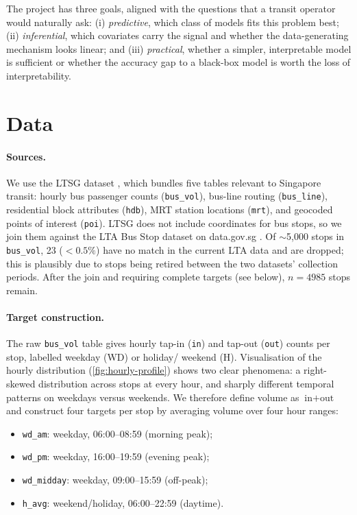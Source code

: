 \documentclass{article}
\begin{document}
The project has three goals, aligned with the questions that a transit
operator would naturally ask: (i) \emph{predictive}, which class of models
fits this problem best; (ii) \emph{inferential}, which covariates carry the
signal and whether the data-generating mechanism looks linear; and (iii)
\emph{practical}, whether a simpler, interpretable model is sufficient or
whether the accuracy gap to a black-box model is worth the loss of
interpretability.

\section{Data}
\label{sec:data}

\paragraph{Sources.}
We use the LTSG dataset \citep{rs14153579}, which bundles five tables
relevant to Singapore transit: hourly bus passenger counts
(\texttt{bus\_vol}), bus-line routing (\texttt{bus\_line}), residential
block attributes (\texttt{hdb}), MRT station locations (\texttt{mrt}), and
geocoded points of interest (\texttt{poi}). LTSG does not include
coordinates for bus stops, so we join them against the LTA Bus Stop dataset
on data.gov.sg \citep{lta2025busstop}. Of $\sim$5,000 stops in \texttt{bus\_vol}, 23 ($<0.5\%$)
have no match in the current LTA data and are dropped; this is plausibly
due to stops being retired between the two datasets' collection periods.
After the join and requiring complete targets (see below), $n = 4985$ stops remain.

\paragraph{Target construction.}
The raw \texttt{bus\_vol} table gives hourly tap-in (\texttt{in}) and
tap-out (\texttt{out}) counts per stop, labelled weekday (WD) or holiday/
weekend (H). Visualisation of the hourly distribution
(\cref{fig:hourly-profile}) shows two clear phenomena: a right-skewed
distribution across stops at every hour, and sharply different temporal
patterns on weekdays versus weekends. We therefore define volume as
$\text{in}+\text{out}$ and construct four targets per stop by averaging
volume over four hour ranges:

\begin{itemize}
  \item \texttt{wd\_am}: weekday, 06:00--08:59 (morning peak);
  \item \texttt{wd\_pm}: weekday, 16:00--19:59 (evening peak);
  \item \texttt{wd\_midday}: weekday, 09:00--15:59 (off-peak);
  \item \texttt{h\_avg}: weekend/holiday, 06:00--22:59 (daytime).
\end{itemize}
\end{document}
